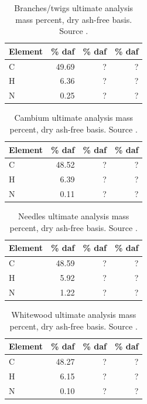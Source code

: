 \begin{table}[H]
    \centering
    \caption{Branches/twigs ultimate analysis mass percent, dry ash-free basis. Source \cite{Unknown-2019}.}
    \begin{tabular}{lrrr}
        \toprule
        Element & \% daf & \% daf & \% daf \\
        \midrule
        C        & 49.69 & ? & ? \\
        H        & 6.36  & ? & ? \\
        N        & 0.25  & ? & ? \\
        \bottomrule
    \end{tabular}
\end{table}

\begin{table}[H]
    \centering
    \caption{Cambium ultimate analysis mass percent, dry ash-free basis. Source \cite{Unknown-2019}.}
    \begin{tabular}{lrrr}
        \toprule
        Element & \% daf & \% daf & \% daf \\
        \midrule
        C        & 48.52 & ? & ? \\
        H        & 6.39  & ? & ? \\
        N        & 0.11  & ? & ? \\
        \bottomrule
    \end{tabular}
\end{table}

\begin{table}[H]
    \centering
    \caption{Needles ultimate analysis mass percent, dry ash-free basis. Source \cite{Unknown-2019}.}
    \begin{tabular}{lrrr}
        \toprule
        Element & \% daf & \% daf & \% daf \\
        \midrule
        C        & 48.59 & ? & ? \\
        H        & 5.92  & ? & ? \\
        N        & 1.22  & ? & ? \\
        \bottomrule
    \end{tabular}
\end{table}

\begin{table}[H]
    \centering
    \caption{Whitewood ultimate analysis mass percent, dry ash-free basis. Source \cite{Unknown-2019}.}
    \begin{tabular}{lrrr}
        \toprule
        Element & \% daf & \% daf & \% daf \\
        \midrule
        C        & 48.27 & ? & ? \\
        H        & 6.15  & ? & ? \\
        N        & 0.10  & ? & ? \\
        \bottomrule
    \end{tabular}
\end{table}

